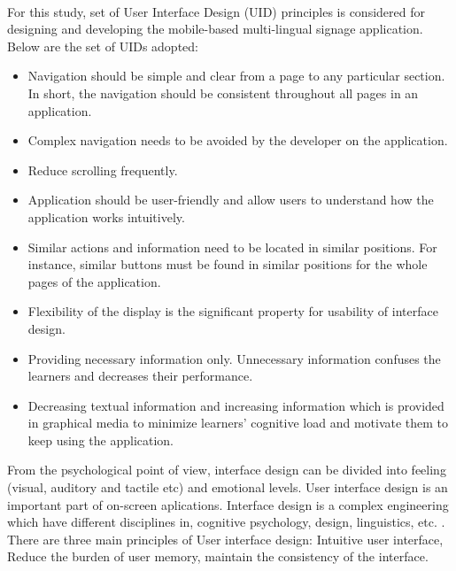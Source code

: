 \documentclass[12pt]{article}
\begin{document}
\paragraph{} For this study, set of User Interface Design (UID) principles is considered \cite{uid} for designing and developing the mobile-based multi-lingual signage application. Below are the set of UIDs adopted:

\begin{itemize}

 \item  Navigation should be simple and clear from a page to
any particular section. In short, the navigation should be
consistent throughout all pages in an application.

 \item  Complex navigation needs to be avoided by the
developer on the application.

 \item Reduce scrolling frequently.

 \item Application should be user-friendly and allow
users to understand how the application works intuitively.

 \item Similar actions and information need to be located in
similar positions. For instance, similar buttons must be
found in similar positions for the whole pages of the
application.

 \item Flexibility of the display is the significant property for
usability of interface design.

 \item Providing necessary information only. Unnecessary
information confuses the learners and decreases their
performance.

 \item  Decreasing textual information and increasing
information which is provided in graphical media to minimize learners' cognitive load and motivate
them to keep using the application.

\end{itemize}


From the psychological point of view, interface design can be divided into feeling (visual, auditory and tactile etc) and emotional levels. User interface design is an important part of on-screen aplications. Interface design is a complex engineering which have different disciplines in, cognitive psychology, design, linguistics, etc. \cite{hci}. There are three main principles of User interface design:  Intuitive user interface, Reduce the burden of user memory, maintain the consistency of the interface. 
\end{document}
